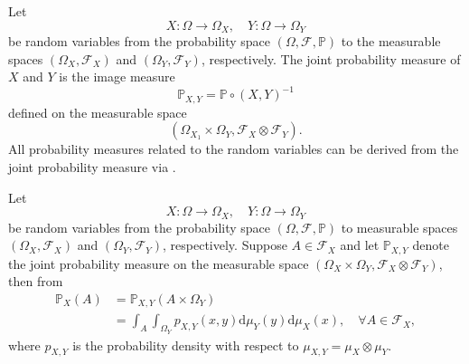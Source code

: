 \begin{definition}
	\label{def:joint}
	Let
	\begin{equation}
		X\colon \Omega \to \Omega_X, \quad Y\colon \Omega \to \Omega_Y
	\end{equation}
	be random variables from the probability space $(\Omega, \mathcal{F}, \mathbb{P})$ to the measurable spaces $(\Omega_X, \mathcal{F}_X)$ and $(\Omega_Y, \mathcal{F}_Y)$, respectively.	The joint probability measure of $X$ and $Y$ is the image measure
	\begin{equation}
		\mathbb{P}_{X,Y} = \mathbb{P}\circ(X,Y)^{-1}
	\end{equation}
	defined on the measurable space 
	\begin{equation}
		(\Omega_{X_1}\times\Omega_{Y}, \mathcal{F}_{X}\otimes\mathcal{F}_{Y}).
	\end{equation}	
	All probability measures related to the random variables can be derived from the joint probability measure via .
\end{definition}

\begin{remark}
	Let
	\begin{equation}
		X\colon \Omega \to \Omega_X, \quad Y\colon \Omega \to \Omega_Y
	\end{equation}
	be random variables from the probability space $(\Omega, \mathcal{F}, \mathbb{P})$ to measurable spaces $(\Omega_X, \mathcal{F}_X)$ and $(\Omega_Y, \mathcal{F}_Y)$, respectively. Suppose $A\in \mathcal{F}_X$ and let $\mathbb{P}_{X,Y}$ denote the joint probability measure on the measurable space $(\Omega_{X}\times\Omega_{Y}, \mathcal{F}_{X}\otimes\mathcal{F}_{Y})$, then from 
	\begin{equation}
			\begin{split}
				\mathbb{P}_X(A) &= \mathbb{P}_{X,Y}(A \times \Omega_Y)\\
				& = \int_{A}\int_{\Omega_Y}p_{X,Y}(x,y)\mathrm{d}\mu_Y(y)\mathrm{d}\mu_X(x), \quad \forall A \in \mathcal{F}_X,
			\end{split}
	\end{equation}
	where $p_{X,Y}$ is the probability density with respect to $\mu_{X,Y} = \mu_X \otimes \mu_Y$.
\end{remark}

